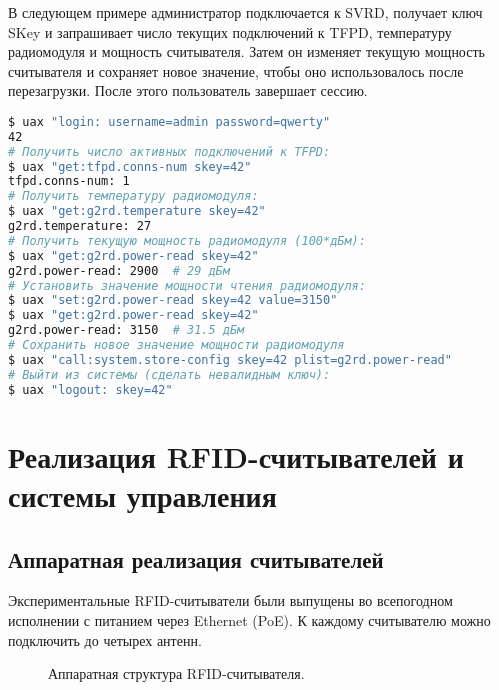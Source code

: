 В следующем примере администратор подключается к SVRD, получает ключ SKey и запрашивает число текущих подключений к TFPD, температуру радиомодуля и мощность считывателя. Затем он изменяет текущую мощность считывателя и сохраняет новое значение, чтобы оно использовалось после перезагрузки. После этого пользователь завершает сессию.

\begin{lstlisting}[language=Bash]
$ uax "login: username=admin password=qwerty"
42
# Получить число активных подключений к TFPD:
$ uax "get:tfpd.conns-num skey=42"
tfpd.conns-num: 1
# Получить температуру радиомодуля:
$ uax "get:g2rd.temperature skey=42"
g2rd.temperature: 27
# Получить текущую мощность радиомодуля (100*дБм):
$ uax "get:g2rd.power-read skey=42"
g2rd.power-read: 2900  # 29 дБм
# Установить значение мощности чтения радиомодуля:
$ uax "set:g2rd.power-read skey=42 value=3150"
$ uax "get:g2rd.power-read skey=42"
g2rd.power-read: 3150  # 31.5 дБм
# Сохранить новое значение мощности радиомодуля
$ uax "call:system.store-config skey=42 plist=g2rd.power-read"
# Выйти из системы (сделать невалидным ключ):
$ uax "logout: skey=42"
\end{lstlisting}



\section{Реализация RFID-считывателей и системы управления}\label{sec:ch5_implementation}

\subsection{Аппаратная реализация считывателей}\label{sec:ch5_implementation_hardware}
Экспериментальные RFID-считыватели были выпущены во всепогодном исполнении с питанием через Ethernet (PoE). К каждому считывателю можно подключить до четырех антенн.

\begin{figure}[ht]
  \caption{Аппаратная структура RFID-считывателя.}
  \label{fig:ch5_reader_hardware}
\end{figure}

